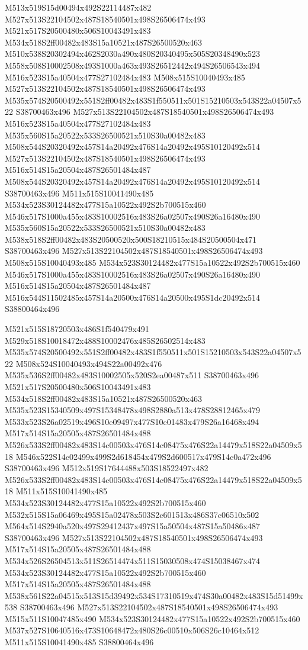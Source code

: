 \documentclass{article}
\begin{document}
\begin{multicols}{2}
M513x519S15d00494x492S22114487x482 M527x513S22104502x487S18540501x498S26506474x493 M521x517S20500480x506S10043491x483 M534x518S2ff00482x483S15a10521x487S26500520x463 M510x538S20302494x462S2030a490x480S20340495x505S20348490x523 M558x508S10002508x493S1000a463x493S26512442x494S26506543x494 M516x523S15a40504x477S27102484x483 M508x515S10040493x485 M527x513S22104502x487S18540501x498S26506474x493 M535x574S20500492x551S2ff00482x483S1f550511x501S15210503x543S22a04507x522 S38700463x496 M527x513S22104502x487S18540501x498S26506474x493 M516x523S15a40504x477S27102484x483 M535x560S15a20522x533S26500521x510S30a00482x483 M508x544S20320492x457S14a20492x476S14a20492x495S10120492x514 M527x513S22104502x487S18540501x498S26506474x493 M516x514S15a20504x487S26501484x487 M508x544S20320492x457S14a20492x476S14a20492x495S10120492x514 S38700463x496 M511x515S10041490x485 M534x523S30124482x477S15a10522x492S2b700515x460 M546x517S1000a455x483S10002516x483S26a02507x490S26a16480x490 M535x560S15a20522x533S26500521x510S30a00482x483 M538x518S2ff00482x483S20500520x500S18210515x484S20500504x471 S38700463x496 M527x513S22104502x487S18540501x498S26506474x493 M508x515S10040493x485 M534x523S30124482x477S15a10522x492S2b700515x460 M546x517S1000a455x483S10002516x483S26a02507x490S26a16480x490 M516x514S15a20504x487S26501484x487 M516x544S11502485x457S14a20500x476S14a20500x495S1dc20492x514 S38800464x496

M521x515S18720503x486S1f540479x491 M529x518S10018472x488S10002476x485S26502514x483 M535x574S20500492x551S2ff00482x483S1f550511x501S15210503x543S22a04507x522 M508x524S10040493x494S22a00492x476 M535x536S2ff00482x483S10002505x520S2ea00487x511 S38700463x496 M521x517S20500480x506S10043491x483 M534x518S2ff00482x483S15a10521x487S26500520x463 M535x523S15340509x497S15348478x498S2880a513x478S28812465x479 M533x523S26a02519x496S10e09497x477S10e01483x479S26a16468x494 M517x514S15a20505x487S26501484x488 M526x533S2ff00482x483S14c00503x476S14c08475x476S22a14479x518S22a04509x518 M546x522S14c02499x499S2d618454x479S2d600517x479S14c0a472x496 S38700463x496 M512x519S17644488x503S18522497x482 M526x533S2ff00482x483S14c00503x476S14c08475x476S22a14479x518S22a04509x518 M511x515S10041490x485 M534x523S30124482x477S15a10522x492S2b700515x460 M532x515S15a06469x495S15a02478x503S2c601513x486S37c06510x502 M564x514S2940a520x497S29412437x497S15a50504x487S15a50486x487 S38700463x496 M527x513S22104502x487S18540501x498S26506474x493 M517x514S15a20505x487S26501484x488 M534x526S26504513x511S26514474x511S15030508x474S15038467x474 M534x523S30124482x477S15a10522x492S2b700515x460 M517x514S15a20505x487S26501484x488 M538x561S22a04515x513S15d39492x534S17310519x474S30a00482x483S15d51499x538 S38700463x496 M527x513S22104502x487S18540501x498S26506474x493 M515x511S10047485x490 M534x523S30124482x477S15a10522x492S2b700515x460 M537x527S10640516x473S10648472x480S26c00510x506S26c10464x512 M511x515S10041490x485 S38800464x496


\end{multicols}
\end{document}
